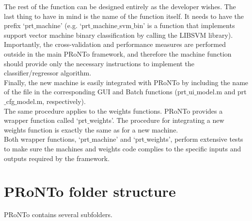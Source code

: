 The rest of the function can be designed entirely as the developer wishes. The last thing to have in mind is the name of the function itself. It needs to have the prefix `prt$\_$machine' (e.g. `prt$\_$machine$\_$svm$\_$bin' is a function that implements support vector machine binary classification by calling the LIBSVM library). Importantly, the cross-validation and performance measures are performed outside in the main PRoNTo framework, and therefore the machine function should provide only the necessary instructions to implement the classifier/regressor algorithm.
\\

Finally, the new machine is easily integrated with PRoNTo by including the name of the file in the corresponding GUI and Batch functions (prt$\_$ui$\_$model.m and prt$\_$cfg$\_$model.m, respectively).
\\

The same procedure applies to the weights functions. PRoNTo provides a wrapper function called `prt$\_$weights'. The procedure for integrating a new weights function is exactly the same as for a new machine.
\\

Both wrapper functions, `prt$\_$machine' and  `prt$\_$weights', perform extensive tests to make sure the machines and weights code complies to the specific inputs and outputs required by the framework.
\\


\section{PRoNTo folder structure}

PRoNTo contains several subfolders. 

